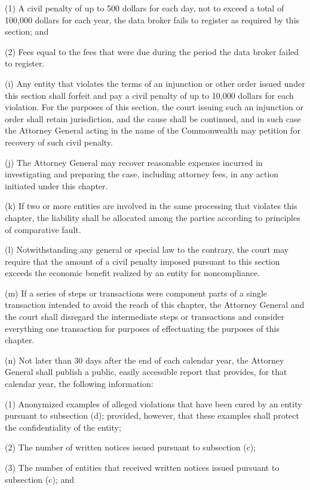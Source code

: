 (1) A civil penalty of up to 500 dollars for each day, not to exceed a total of 100,000 dollars for each year, the data broker fails to register as required by this section; and

(2) Fees equal to the fees that were due during the period the data broker failed to register.

(i) Any entity that violates the terms of an injunction or other order issued under this section shall forfeit and pay a civil penalty of up to 10,000 dollars for each violation. For the purposes of this section, the court issuing such an injunction or order shall retain jurisdiction, and the cause shall be continued, and in such case the Attorney General acting in the name of the Commonwealth may petition for recovery of such civil penalty.

(j) The Attorney General may recover reasonable expenses incurred in investigating and preparing the case, including attorney fees, in any action initiated under this chapter.

(k) If two or more entities are involved in the same processing that violates this chapter, the liability shall be allocated among the parties according to principles of comparative fault. 

(l) Notwithstanding any general or special law to the contrary, the court may require that the amount of a civil penalty imposed pursuant to this section exceeds the economic benefit realized by an entity for noncompliance.

(m) If a series of steps or transactions were component parts of a single transaction intended to avoid the reach of this chapter, the Attorney General and the court shall disregard the intermediate steps or transactions and consider everything one transaction for purposes of effectuating the purposes of this chapter. 

(n) Not later than 30 days after the end of each calendar year, the Attorney General shall publish a public, easily accessible report that provides, for that calendar year, the following information:

(1) Anonymized examples of alleged violations that have been cured by an entity pursuant to subsection (d); provided, however, that these examples shall protect the confidentiality of the entity;

(2) The number of written notices issued pursuant to subsection (c);

(3) The number of entities that received written notices issued pursuant to subsection (c); and

